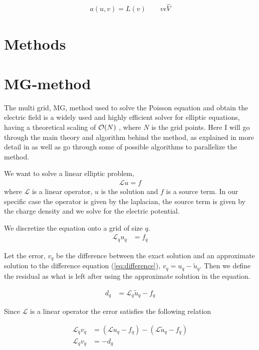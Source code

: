 			\begin{align}
				a(u,v) = L(v)	\qquad v\epsilon \hat{V}
			\end{align}

			



	\section{Methods}

	\section{MG-method}
		The multi grid, MG, method used to solve the Poisson equation and obtain the electric field is a widely used and highly efficient solver for elliptic equations, having a theoretical scaling of \(\order{N}\) \citep{Press1987}, where \(N\) is the grid points. Here I will go through the main theory and algorithm behind the method, as explained in more detail in \citep{Press1987,Trottenberg2000} as well as go through some of possible algorithms to parallelize the method.

		We want to solve a linear elliptic problem, 
			\begin{align}
				\mathcal{L} u = f
			\end{align}
		where \(\mathcal{L}\) is a linear operator, \(u\) is the solution and \(f\) is a source term. In our specific case the operator is given by the laplacian, the source term is given by the charge density and we solve for the electric potential.

		We discretize the equation onto a grid of size \(q\).
		\begin{align}
			\mathcal{L}_q u_q &= f_q \label{eq:difference}
		\end{align}

		Let the error, \(v_q\) be the difference between the exact solution and an approximate solution to the difference equation (\ref{eq:difference}), \( v_q = u_q - \tilde{u}_q \). Then we define the residual as what is left after using the approximate solution in the equation.

		\begin{align}
			d_q &= \mathcal{L}_q \tilde{u}_q - f_q
		\end{align}

		Since \(\mathcal{L}\) is a linear operator the error satisfies the following relation

		\begin{align}
			\mathcal{L}_q v_q &= (\mathcal{L}u_q - f_q) - (\mathcal{L}\tilde{u}_q  - f_q)
			\\
			\mathcal{L}_q v_q &= - d_q \label{eq:diff_MG}
		\end{align}

